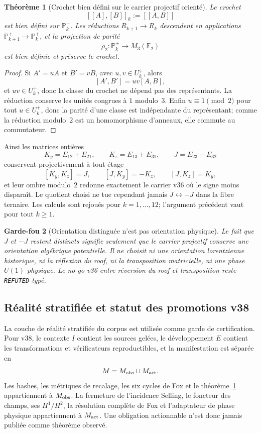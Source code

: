 \documentclass[11pt,a4paper]{article}
\newtheorem{theorem}{Théorème}[section]
\newtheorem{guardrail}[theorem]{Garde-fou}
\newcommand{\certRefuted}{\texttt{REFUTED}}
\begin{document}
\begin{theorem}[Crochet bien défini sur le carrier projectif orienté]\label{thm:v38-projective-bracket}
Le crochet
\[
 [[A],[B]]_k:=[[A,B]]
\]
est bien défini sur $\mathbb P_k^+$. Les réductions $R_{k+1}\to R_k$ descendent en applications $\mathbb P_{k+1}^+\to\mathbb P_k^+$, et la projection de parité
\[
 \bar\rho_2:\mathbb P_k^+\longrightarrow M_3(\mathbb F_2)
\]
est bien définie et préserve le crochet.
\end{theorem}

\begin{proof}
Si $A'=uA$ et $B'=vB$, avec $u,v\in U_k^+$, alors
\[
 [A',B']=uv[A,B],
\]
et $uv\in U_k^+$, donc la classe du crochet ne dépend pas des représentants. La réduction conserve les unités congrues à $1$ modulo~$3$. Enfin $u\equiv1\pmod2$ pour tout $u\in U_k^+$, donc la parité d'une classe est indépendante du représentant; comme la réduction modulo~$2$ est un homomorphisme d'anneaux, elle commute au commutateur.
\end{proof}

Ainsi les matrices entières
\[
 K_y=E_{12}+E_{21},\qquad K_z=E_{13}+E_{31},\qquad J=E_{23}-E_{32}
\]
conservent projectivement à tout étage
\[
 [K_y,K_z]=J,\qquad[J,K_y]=-K_z,\qquad[J,K_z]=K_y,
\]
et leur ombre modulo~$2$ redonne exactement le carrier v36 où le signe moins disparaît. Le quotient choisi ne tue cependant jamais $J\leftrightarrow-J$ dans la fibre ternaire. Les calculs sont rejoués pour $k=1,\ldots,12$; l'argument précédent vaut pour tout $k\ge1$.

\begin{guardrail}[Orientation distinguée n'est pas orientation physique]
Le fait que $J$ et $-J$ restent distincts signifie seulement que le carrier projectif conserve une orientation algébrique potentielle. Il ne choisit ni une orientation lorentzienne historique, ni la réflexion du roof, ni la transposition matricielle, ni une phase $U(1)$ physique. Le no-go v36 entre réversion du roof et transposition reste \certRefuted{}-typé.
\end{guardrail}

\subsection{Réalité stratifiée et statut des promotions v38}

La couche de réalité stratifiée du corpus est utilisée comme garde de certification. Pour v38, le contexte $I$ contient les sources gelées, le développement $E$ contient les transformations et vérificateurs reproductibles, et la manifestation est séparée en
\[
 M=M_{\rm obs}\sqcup M_{\rm act}.
\]
Les hashes, les métriques de recalage, les six cycles de Fox et le théorème~\ref{thm:v38-projective-bracket} appartiennent à $M_{\rm obs}$. La fermeture de l'incidence Selling, le foncteur des champs, ses $H^1/H^2$, la résolution complète de Fox et l'adaptateur de phase physique appartiennent à $M_{\rm act}$. Une obligation actionnable n'est donc jamais publiée comme théorème observé.
\end{document}
